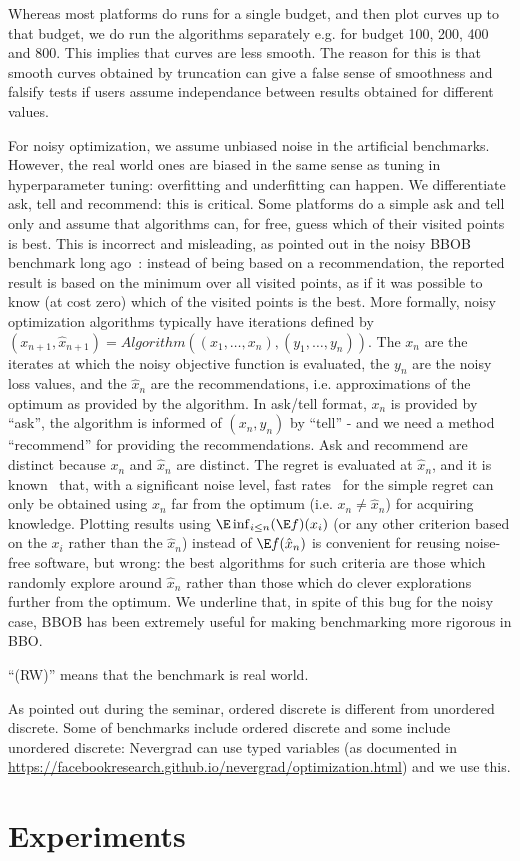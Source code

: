 \documentclass{article}
\begin{document}
Whereas most platforms do runs for a single budget, and then plot curves up to that budget, we do run the algorithms separately e.g. for budget 100, 200, 400 and 800. This implies that curves are less smooth. The reason for this is that smooth curves obtained by truncation can give a false sense of smoothness and falsify tests if users assume independance between results obtained for different values.

For noisy optimization, we assume unbiased noise in the artificial benchmarks. However, the real world ones are biased in the same sense as tuning in hyperparameter tuning: overfitting and underfitting can happen.
We differentiate ask, tell and recommend: this is critical. Some platforms do a simple ask and tell only and assume that algorithms can, for free, guess which of their visited points is best. This is incorrect and misleading, as pointed out in the noisy BBOB benchmark long ago~: instead of being based on a recommendation, the reported result is based on the minimum  over all visited points, as if it was possible to know (at cost zero) which of the visited points is the best.
More formally, noisy optimization algorithms typically have iterations defined by $(x_{n+1},\hat x_{n+1})=Algorithm((x_1,\dots,x_n),(y_1,\dots,y_n))$. The $x_n$ are the iterates at which the noisy objective function is evaluated, the $y_n$ are the noisy loss values, and the $\hat x_n$ are the recommendations, i.e. approximations of the optimum as provided by the algorithm. In ask/tell format, $x_n$ is provided by ``ask'', the algorithm is informed of $(x_n,y_n)$ by ``tell'' - and we need a method ``recommend'' for providing the recommendations. Ask and recommend are distinct because $x_n$ and $\hat x_n$ are distinct. The regret is evaluated at $\hat x_n$, and it is known~ that, with a significant noise level, fast rates~ for the simple regret can only be obtained using $x_n$ far from the optimum (i.e. $x_n\neq \hat x_n$) for acquiring knowledge. Plotting results using $\E\inf_{i\leq n}(\E f)(x_i)$ (or any other criterion based on the $x_i$ rather than the $\hat x_n$) instead of $\E f(\hat x_n)$ is convenient for reusing noise-free software, but wrong: the best algorithms for such criteria are those which randomly explore around $\hat x_n$ rather than those which do clever explorations further from the optimum. We underline that, in spite of this bug for the noisy case, BBOB has been extremely useful for making benchmarking more rigorous in BBO.

``(RW)'' means that the benchmark is real world.

As pointed out during the seminar, ordered discrete is different from unordered discrete. Some of benchmarks include ordered discrete and some include unordered discrete: Nevergrad can use typed variables (as documented in \url{https://facebookresearch.github.io/nevergrad/optimization.html}) and we use this.

\section{Experiments}
\end{document}

